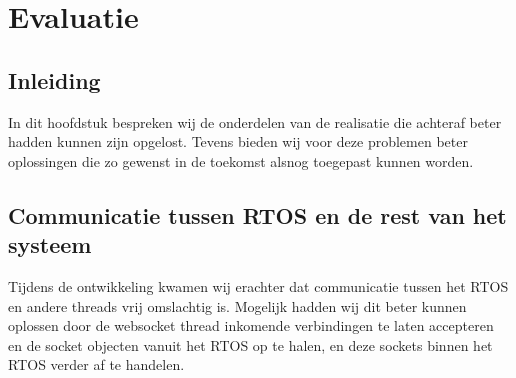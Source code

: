 \chapter{Evaluatie}
\section{Inleiding}
In dit hoofdstuk bespreken wij de onderdelen van de realisatie die achteraf beter hadden kunnen zijn opgelost.
Tevens bieden wij voor deze problemen beter oplossingen die zo gewenst in de toekomst alsnog toegepast kunnen worden.

\section{Communicatie tussen RTOS en de rest van het systeem}
Tijdens de ontwikkeling kwamen wij erachter dat communicatie tussen het RTOS en andere threads vrij omslachtig is. Mogelijk hadden wij dit beter kunnen oplossen door de websocket thread inkomende verbindingen te laten accepteren en de socket objecten vanuit het RTOS op te halen, en deze sockets binnen het RTOS verder af te handelen.
